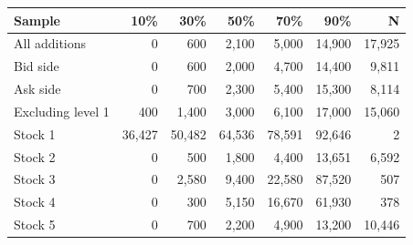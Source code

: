 \begin{tabular}{lrrrrrr}
\toprule
Sample & 10\% & 30\% & 50\% & 70\% & 90\% & N \\
\midrule
All additions & 0 & 600 & 2{,}100 & 5{,}000 & 14{,}900 & 17{,}925 \\
Bid side & 0 & 600 & 2{,}000 & 4{,}700 & 14{,}400 & 9{,}811 \\
Ask side & 0 & 700 & 2{,}300 & 5{,}400 & 15{,}300 & 8{,}114 \\
Excluding level 1 & 400 & 1{,}400 & 3{,}000 & 6{,}100 & 17{,}000 & 15{,}060 \\
Stock 1 & 36{,}427 & 50{,}482 & 64{,}536 & 78{,}591 & 92{,}646 & 2 \\
Stock 2 & 0 & 500 & 1{,}800 & 4{,}400 & 13{,}651 & 6{,}592 \\
Stock 3 & 0 & 2{,}580 & 9{,}400 & 22{,}580 & 87{,}520 & 507 \\
Stock 4 & 0 & 300 & 5{,}150 & 16{,}670 & 61{,}930 & 378 \\
Stock 5 & 0 & 700 & 2{,}200 & 4{,}900 & 13{,}200 & 10{,}446 \\
\bottomrule
\end{tabular}
